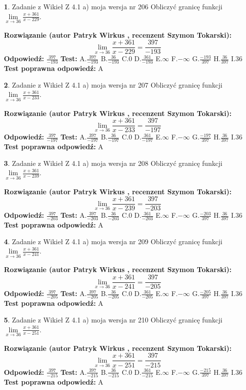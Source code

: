 \documentclass[12pt, a4paper]{article}
\theoremstyle{definition} %
\newtheorem{zad}{}
\newcommand{\zadStart}[1]{\begin{zad}#1\newline}
\newcommand{\zadStop}{\end{zad}}
\newcommand{\rozwStart}[2]{\noindent \textbf{Rozwiązanie (autor #1 , recenzent #2): }\newline}
\newcommand{\rozwStop}{\newline}
\newcommand{\odpStart}{\noindent \textbf{Odpowiedź:}\newline}
\newcommand{\odpStop}{\newline}
\newcommand{\testStart}{\noindent \textbf{Test:}\newline}
\newcommand{\testStop}{\newline}
\newcommand{\kluczStart}{\noindent \textbf{Test poprawna odpowiedź:}\newline}
\newcommand{\kluczStop}{\newline}
\begin{document}
\zadStart{Zadanie z Wikieł Z 4.1 a) moja wersja nr 206}
Obliczyć granicę funkcji $\lim\limits_{x\to36}\frac{x+361}{x-229}$.
\zadStop
\rozwStart{Patryk Wirkus}{Szymon Tokarski}
$$\lim\limits_{x\to36}\frac{x+361}{x-229} = \frac{397}{-193}$$
\rozwStop
\odpStart
$\frac{397}{-193}$
\odpStop
\testStart
A.$\frac{397}{-193}$
B.$\frac{36}{-193}$
C.$0$
D.$\frac{361}{-193}$
E.$\infty$
F.$-\infty$
G.$\frac{-193}{397}$
H.$\frac{36}{397}$
I.$36$
\testStop
\kluczStart
A
\kluczStop



\zadStart{Zadanie z Wikieł Z 4.1 a) moja wersja nr 207}
Obliczyć granicę funkcji $\lim\limits_{x\to36}\frac{x+361}{x-233}$.
\zadStop
\rozwStart{Patryk Wirkus}{Szymon Tokarski}
$$\lim\limits_{x\to36}\frac{x+361}{x-233} = \frac{397}{-197}$$
\rozwStop
\odpStart
$\frac{397}{-197}$
\odpStop
\testStart
A.$\frac{397}{-197}$
B.$\frac{36}{-197}$
C.$0$
D.$\frac{361}{-197}$
E.$\infty$
F.$-\infty$
G.$\frac{-197}{397}$
H.$\frac{36}{397}$
I.$36$
\testStop
\kluczStart
A
\kluczStop



\zadStart{Zadanie z Wikieł Z 4.1 a) moja wersja nr 208}
Obliczyć granicę funkcji $\lim\limits_{x\to36}\frac{x+361}{x-239}$.
\zadStop
\rozwStart{Patryk Wirkus}{Szymon Tokarski}
$$\lim\limits_{x\to36}\frac{x+361}{x-239} = \frac{397}{-203}$$
\rozwStop
\odpStart
$\frac{397}{-203}$
\odpStop
\testStart
A.$\frac{397}{-203}$
B.$\frac{36}{-203}$
C.$0$
D.$\frac{361}{-203}$
E.$\infty$
F.$-\infty$
G.$\frac{-203}{397}$
H.$\frac{36}{397}$
I.$36$
\testStop
\kluczStart
A
\kluczStop



\zadStart{Zadanie z Wikieł Z 4.1 a) moja wersja nr 209}
Obliczyć granicę funkcji $\lim\limits_{x\to36}\frac{x+361}{x-241}$.
\zadStop
\rozwStart{Patryk Wirkus}{Szymon Tokarski}
$$\lim\limits_{x\to36}\frac{x+361}{x-241} = \frac{397}{-205}$$
\rozwStop
\odpStart
$\frac{397}{-205}$
\odpStop
\testStart
A.$\frac{397}{-205}$
B.$\frac{36}{-205}$
C.$0$
D.$\frac{361}{-205}$
E.$\infty$
F.$-\infty$
G.$\frac{-205}{397}$
H.$\frac{36}{397}$
I.$36$
\testStop
\kluczStart
A
\kluczStop



\zadStart{Zadanie z Wikieł Z 4.1 a) moja wersja nr 210}
Obliczyć granicę funkcji $\lim\limits_{x\to36}\frac{x+361}{x-251}$.
\zadStop
\rozwStart{Patryk Wirkus}{Szymon Tokarski}
$$\lim\limits_{x\to36}\frac{x+361}{x-251} = \frac{397}{-215}$$
\rozwStop
\odpStart
$\frac{397}{-215}$
\odpStop
\testStart
A.$\frac{397}{-215}$
B.$\frac{36}{-215}$
C.$0$
D.$\frac{361}{-215}$
E.$\infty$
F.$-\infty$
G.$\frac{-215}{397}$
H.$\frac{36}{397}$
I.$36$
\testStop
\kluczStart
A
\kluczStop
\end{document}
